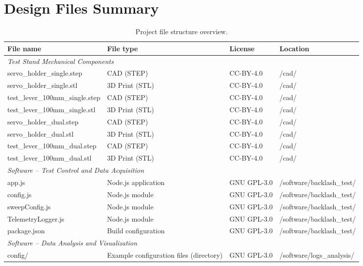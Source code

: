\documentclass[11pt,letterpaper]{article}
\begin{document}
\section{Design Files Summary}
\label{sec:design-files}

\begin{table}[H]
\centering
\caption{Project file structure overview.}
\label{tab:designfiles}
\small
\begin{tabular}{llll}
\toprule
\textbf{File name} & \textbf{File type} & \textbf{License} & \textbf{Location} \\
\midrule
\multicolumn{4}{l}{\textit{Test Stand Mechanical Components}} \\
\midrule
servo\_holder\_single.step & CAD (STEP) & CC-BY-4.0 & /cad/ \\
servo\_holder\_single.stl & 3D Print (STL) & CC-BY-4.0 & /cad/ \\
test\_lever\_100mm\_single.step & CAD (STEP) & CC-BY-4.0 & /cad/ \\
test\_lever\_100mm\_single.stl & 3D Print (STL) & CC-BY-4.0 & /cad/ \\
servo\_holder\_dual.step & CAD (STEP) & CC-BY-4.0 & /cad/ \\
servo\_holder\_dual.stl & 3D Print (STL) & CC-BY-4.0 & /cad/ \\
test\_lever\_100mm\_dual.step & CAD (STEP) & CC-BY-4.0 & /cad/ \\
test\_lever\_100mm\_dual.stl & 3D Print (STL) & CC-BY-4.0 & /cad/ \\
\midrule
\multicolumn{4}{l}{\textit{Software -- Test Control and Data Acquisition}} \\
\midrule
app.js & Node.js application & GNU GPL-3.0& /software/backlash\_test/ \\
config.js & Node.js module & GNU GPL-3.0 & /software/backlash\_test/ \\
sweepConfig.js & Node.js module & GNU GPL-3.0 & /software/backlash\_test/ \\
TelemetryLogger.js & Node.js module & GNU GPL-3.0 & /software/backlash\_test/ \\
package.json & Build configuration & GNU GPL-3.0 & /software/backlash\_test/ \\
\midrule
\multicolumn{4}{l}{\textit{Software -- Data Analysis and Visualization}} \\
\midrule
config/ & Example configuration files (directory) & GNU GPL-3.0 & /software/logs\_analysis/ \\

\end{tabular}
\end{table}
\end{document}
